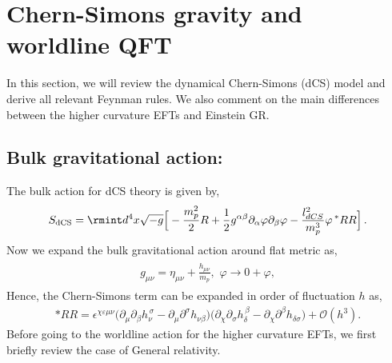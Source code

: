 \section{Chern-Simons gravity and worldline QFT}
\label{ch3:sec2}
In this section, we will review the dynamical Chern-Simons (dCS) model and derive all relevant Feynman rules. We also comment on the main differences between the higher curvature EFTs and Einstein GR.
\subsection*{Bulk gravitational action:}
The bulk action for dCS theory is given by,
\begin{align}
    \begin{split}
        S_{\textrm{dCS}}=\rmint d^4 x\sqrt{-g}\Big[-\frac{m_p^2}{2}R+\frac{1}{2}g^{\alpha\beta}\partial_{\alpha}\varphi\partial_{\beta}\varphi-\frac{l_{dCS}^2}{m_p^3}\varphi\, {}^{*}R R\Big]\,.
    \end{split}
\end{align}
Now we expand the bulk gravitational action around flat metric as,
\begin{align}
    \begin{split}
        g_{\mu\nu}=\eta_{\mu\nu}+\frac{h_{\mu\nu}}{m_p},\,\, \varphi\to 0+\varphi,
    \end{split}
\end{align}
Hence, the Chern-Simons term can be expanded in order of fluctuation $h$ as,
\begin{align}
    *RR=\epsilon^{\chi\varepsilon\mu\nu}\Big(\partial_\mu\partial_\beta h_{\nu}^{\,\sigma}-\partial_\mu \partial^\sigma h_{\nu\beta}\Big)\Big(\partial_{\chi}\partial_{\sigma}h_{\delta}^{\,\beta}-\partial_{\chi}\partial^{\beta}h_{\delta\sigma}\Big)+\mathcal{O}(h^3).
\end{align}
Before going to the worldline action for the higher curvature EFTs, we first briefly review the case of General relativity.
